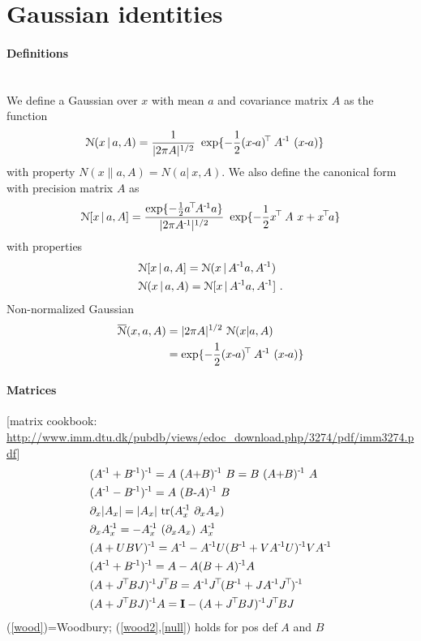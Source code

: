 

\section{Gaussian identities}

\renewcommand{\-}{\myminus}
\newcommand{\+}{\myplus}
\renewcommand{\T}{{\!\top\!}}
\renewcommand{\mT}{{\myminus{}\top}}

\paragraph{Definitions}~\\
We define a Gaussian over $x$ with mean $a$ and covariance matrix
$A$ as the function
\begin{align}
\NN(x \| a,A) &= \frac{1}{|2\pi A|^{1/2}}~ \exp\{-\half (x\-a)^\T~ A^\1~ (x\-a)\}
\end{align}
with property $N(x \| a,A) = N(a |\ x,A)$. We also define the
canonical form with precision matrix $A$ as
\begin{align}
\NN[x \| a,A]
 = \frac{\exp\{-\half a^\T A^\1a\}}{|2\pi A^\1|^{1/2}}~
   \exp\{-\half x^\T~ A~ x + x^\T a\}
\end{align}
with properties
\begin{align}
& {\cal N}[x \,|\, a,A] = {\cal N}(x \,|\, A^{{\hspace*{-.0pt}\text{\rm -}\hspace*{-.5pt}}1} a,A^{{\hspace*{-.0pt}\text{\rm -}\hspace*{-.5pt}}1}) \\
& {\cal N}(x \,|\, a,A) = {\cal N}[x \,|\, A^{{\hspace*{-.0pt}\text{\rm -}\hspace*{-.5pt}}1} a,A^{{\hspace*{-.0pt}\text{\rm -}\hspace*{-.5pt}}1}] ~.
\end{align}
Non-normalized Gaussian
\begin{align}
\oNN(x,a,A)
 &= |2\pi A|^{1/2}~ \NN(x|a,A) \\
 &= \exp \{-\half (x\-a)^\T~ A^\1~ (x\-a)\}
\end{align}

\paragraph{Matrices}
[matrix cookbook: {\tiny\url{http://www.imm.dtu.dk/pubdb/views/edoc_download.php/3274/pdf/imm3274.pdf}}]
\renewcommand{\bar}{\widehat}
\begin{align}
&(A^\1 + B^\1)^\1 = A~ (A\+B)^\1~ B = B~ (A\+B)^\1~ A \\
&(A^\1 - B^\1)^\1 = A~ (B\-A)^\1~ B \\
&\del_x |A_x| = |A_x|~ \tr(A_x^\1~ \del_x A_x) \\
&\del_x A_x^\1 = - A_x^\1~ (\del_x A_x)~ A_x^\1 \\
&(A+UBV)^\1 = A^\1 - A^\1 U (B^\1 + VA^\1U)^\1 V A^\1 \label{wood}\\
&(A^\1+B^\1)^\1 = A - A (B + A)^\1 A \\
&(A + J^\T B J)^\1 J^\T B 
= A^\1 J^\T (B^\1 + J A^\1 J^\T)^\1 \label{wood2}\\
&(A + J^\T B J)^\1 A
= \Id - (A + J^\T B J)^\1 J^\T B J  \label{null}
\end{align}
(\ref{wood})=Woodbury; (\ref{wood2},\ref{null}) holds for pos def $A$ and $B$

